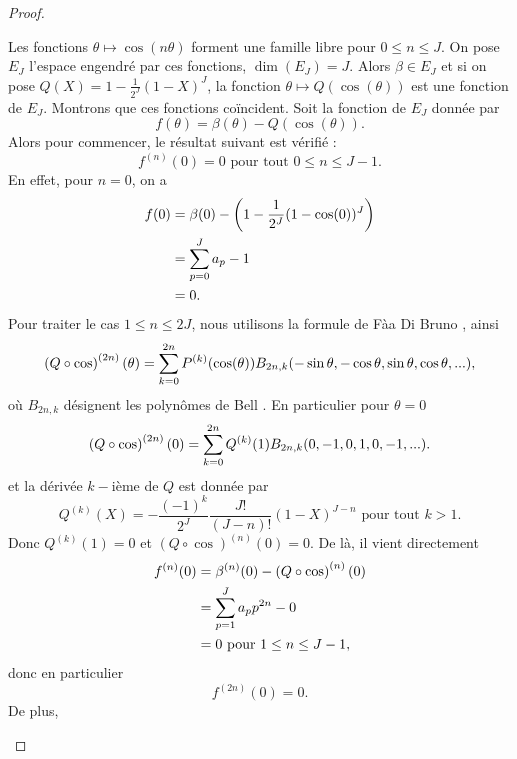 \begin{proof}
\begin{itemize}
Les fonctions $\theta \mapsto \cos (n \theta)$ forment une famille libre pour $0 \leq n \leq J$. On pose $E_J$ l'espace engendré par ces fonctions, $\dim (E_J) = J$. Alors $\beta \in E_J$ et si on pose $Q(X)= 1 - \frac{1}{2^J}(1-X)^J$, la fonction $\theta \mapsto Q(\cos(\theta))$ est une fonction de $E_J$. Montrons que ces fonctions coïncident.
Soit la fonction de $E_J$ donnée par
\begin{equation}
f(\theta) = \beta(\theta) - Q(\cos (\theta)).
\end{equation}
Alors pour commencer, le résultat suivant est vérifié :
\begin{equation}
f^{(n)}(0) = 0 \text{ pour tout } 0 \leq n \leq J-1.
\end{equation}
En effet, pour $n=0$, on a
\begin{align*}
f(0) & = \beta(0) - \left( 1-\dfrac{1}{2^J}(1 - \cos (0))^J \right) \\
	& = \displaystyle\sum\limits_{p=0}^J a_p - 1 \\
	& = 0.
\end{align*}
Pour traiter le cas $1 \leq n \leq 2J$, nous utilisons la formule de Fàa Di Bruno \cite{Comtet2012}, ainsi
\begin{equation}
\left( Q \circ \cos \right)^{(2n)}(\theta) = \displaystyle\sum\limits_{k=0}^{2n} P^{(k)}(\cos(\theta)) B_{2n,k}(-\sin \theta, - \cos \theta, \sin \theta, \cos \theta, ...),
\end{equation}
où $B_{2n,k}$ désignent les polynômes de Bell \cite{Comtet2012}.
En particulier pour $\theta = 0$
\begin{equation}
\left( Q \circ \cos \right)^{(2n)}(0) = \displaystyle\sum\limits_{k=0}^{2n} Q^{(k)}(1) B_{2n,k}(0, -1, 0, 1, 0, -1, ...).
\end{equation}
et la dérivée $k-$ième de $Q$ est donnée par
\begin{equation}
Q^{(k)}(X) = - \dfrac{(-1)^k}{2^J} \dfrac{J!}{(J-n)!}(1-X)^{J-n} \text{ pour tout } k>1.
\end{equation}
Donc $Q^{(k)}(1)=0$ et $\left( Q \circ \cos \right)^{(n)}(0) =0$. De là, il vient directement
\begin{align*}
f^{(n)}(0) & = \beta^{(n)}(0) - \left( Q \circ \cos \right)^{(n)}(0) \\
	& = \displaystyle\sum\limits_{p=1}^J a_p p^{2n} - 0 \\
	& = 0 \text{ pour } 1 \leq n \leq J-1,
\end{align*}
donc en particulier
\begin{equation}
f^{(2n)}(0)=0.
\end{equation}
De plus,

\end{itemize}
\end{proof}
